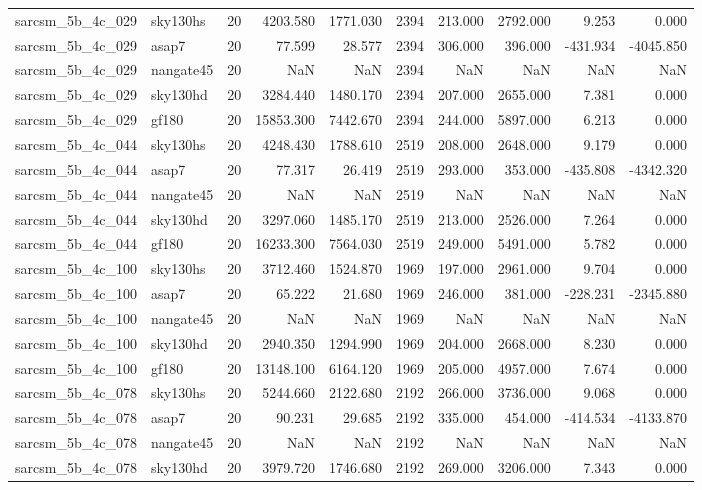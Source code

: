 \documentclass{article}
\begin{document}
\begin{longtable}{llrrrrrrrr}
sarcsm\_5b\_4c\_029 & sky130hs & 20 & 4203.580 & 1771.030 & 2394 & 213.000 & 2792.000 & 9.253 & 0.000 \\
sarcsm\_5b\_4c\_029 & asap7 & 20 & 77.599 & 28.577 & 2394 & 306.000 & 396.000 & -431.934 & -4045.850 \\
sarcsm\_5b\_4c\_029 & nangate45 & 20 & NaN & NaN & 2394 & NaN & NaN & NaN & NaN \\
sarcsm\_5b\_4c\_029 & sky130hd & 20 & 3284.440 & 1480.170 & 2394 & 207.000 & 2655.000 & 7.381 & 0.000 \\
sarcsm\_5b\_4c\_029 & gf180 & 20 & 15853.300 & 7442.670 & 2394 & 244.000 & 5897.000 & 6.213 & 0.000 \\
sarcsm\_5b\_4c\_044 & sky130hs & 20 & 4248.430 & 1788.610 & 2519 & 208.000 & 2648.000 & 9.179 & 0.000 \\
sarcsm\_5b\_4c\_044 & asap7 & 20 & 77.317 & 26.419 & 2519 & 293.000 & 353.000 & -435.808 & -4342.320 \\
sarcsm\_5b\_4c\_044 & nangate45 & 20 & NaN & NaN & 2519 & NaN & NaN & NaN & NaN \\
sarcsm\_5b\_4c\_044 & sky130hd & 20 & 3297.060 & 1485.170 & 2519 & 213.000 & 2526.000 & 7.264 & 0.000 \\
sarcsm\_5b\_4c\_044 & gf180 & 20 & 16233.300 & 7564.030 & 2519 & 249.000 & 5491.000 & 5.782 & 0.000 \\
sarcsm\_5b\_4c\_100 & sky130hs & 20 & 3712.460 & 1524.870 & 1969 & 197.000 & 2961.000 & 9.704 & 0.000 \\
sarcsm\_5b\_4c\_100 & asap7 & 20 & 65.222 & 21.680 & 1969 & 246.000 & 381.000 & -228.231 & -2345.880 \\
sarcsm\_5b\_4c\_100 & nangate45 & 20 & NaN & NaN & 1969 & NaN & NaN & NaN & NaN \\
sarcsm\_5b\_4c\_100 & sky130hd & 20 & 2940.350 & 1294.990 & 1969 & 204.000 & 2668.000 & 8.230 & 0.000 \\
sarcsm\_5b\_4c\_100 & gf180 & 20 & 13148.100 & 6164.120 & 1969 & 205.000 & 4957.000 & 7.674 & 0.000 \\
sarcsm\_5b\_4c\_078 & sky130hs & 20 & 5244.660 & 2122.680 & 2192 & 266.000 & 3736.000 & 9.068 & 0.000 \\
sarcsm\_5b\_4c\_078 & asap7 & 20 & 90.231 & 29.685 & 2192 & 335.000 & 454.000 & -414.534 & -4133.870 \\
sarcsm\_5b\_4c\_078 & nangate45 & 20 & NaN & NaN & 2192 & NaN & NaN & NaN & NaN \\
sarcsm\_5b\_4c\_078 & sky130hd & 20 & 3979.720 & 1746.680 & 2192 & 269.000 & 3206.000 & 7.343 & 0.000 \\

\end{longtable}
\end{document}
